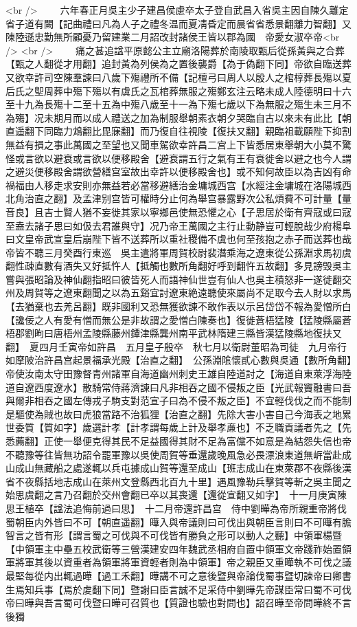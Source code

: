 <br />
　　六年春正月吳主少子建昌侯慮卒太子登自武昌入省吳主因自陳久離定省子道有闕【記曲禮曰凡為人子之禮冬温而夏凊昏定而晨省省悉景翻離力智翻】又陳陸遜忠勤無所顧憂乃留建業二月詔改封諸侯王皆以郡為國　帝愛女淑卒帝<br />
<br />
　　痛之甚追諡平原懿公主立廟洛陽葬於南陵取甄后從孫黃與之合葬【甄之人翻從才用翻】追封黃為列侯為之置後襲爵【為于偽翻下同】帝欲自臨送葬又欲幸許司空陳羣諫曰八歲下殤禮所不備【記檀弓曰周人以殷人之棺椁葬長殤以夏后氏之堲周葬中殤下殤以有虞氏之瓦棺葬無服之殤鄭玄注云略未成人陸德明曰十六至十九為長殤十二至十五為中殤八歲至十一為下殤七歲以下為無服之殤生未三月不為殤】况未期月而以成人禮送之加為制服舉朝素衣朝夕哭臨自古以來未有此比【朝直遥翻下同臨力鴆翻比毘寐翻】而乃復自往視陵【復扶又翻】親臨祖載願陛下抑割無益有損之事此萬國之至望也又聞車駕欲幸許昌二宫上下皆悉居東舉朝大小莫不驚怪或言欲以避衰或言欲以便移殿舍【避衰謂五行之氣有王有衰徙舍以避之也今人謂之避災便移殿舍謂欲營繕宫室故出幸許以便移殿舍也】或不知何故臣以為吉凶有命禍福由人移走求安則亦無益若必當移避繕治金墉城西宫【水經注金墉城在洛陽城西北角治直之翻】及孟津别宫皆可權時分止何為舉宫暴露野次公私煩費不可計量【量音良】且吉士賢人猶不妄徙其家以寧鄉邑使無恐懼之心【子思居於衛有齊寇或曰寇至盍去諸子思曰如伋去君誰與守】况乃帝王萬國之主行止動静豈可輕脫哉少府楊阜曰文皇帝武宣皇后崩陛下皆不送葬所以重社稷備不虞也何至孩抱之赤子而送葬也哉帝皆不聽三月癸酉行東巡　吳主遣將軍周賀校尉裴潛乘海之遼東從公孫淵求馬初虞翻性疎直數有酒失又好抵忤人【抵觸也數所角翻好呼到翻忤五故翻】多見謗毁吳主嘗與張昭論及神仙翻指昭曰彼皆死人而語神仙世豈有仙人也吳主積怒非一遂徙翻交州及周賀等之遼東翻聞之以為五谿宜討遼東絶遠聽使來屬尚不足取今去人財以求馬【去猶棄也去羌呂翻】既非國利又恐無獲欲諫不敢作表以示呂岱岱不報為愛憎所白【讒佞之人有愛有憎而無公是非故謂之愛憎白陳奏也】復徙蒼梧猛陵【猛陵縣屬蒼梧郡劉昫曰唐梧州孟陵縣藤州鐔津縣龔州南平武林隋建三縣皆漢猛陵縣地復扶又翻】　夏四月壬寅帝如許昌　五月皇子殷卒　秋七月以衛尉董昭為司徒　九月帝行如摩陂治許昌宫起景福承光殿【治直之翻】　公孫淵隂懷貳心數與吳通【數所角翻】帝使汝南太守田豫督青州諸軍自海道幽州刺史王雄自陸道討之【海道自東萊浮海陸道自遼西度遼水】散騎常侍蔣濟諫曰凡非相吞之國不侵叛之臣【光武報竇融書曰吾與爾非相吞之國左傳戎子駒支對范宣子曰為不侵不叛之臣】不宜輕伐伐之而不能制是驅使為賊也故曰虎狼當路不治狐狸【治直之翻】先除大害小害自己今海表之地累世委質【質如字】歲選計孝【計孝謂每歲上計及舉孝亷也】不乏職貢議者先之【先悉薦翻】正使一舉便克得其民不足益國得其財不足為富儻不如意是為結怨失信也帝不聽豫等往皆無功詔令罷軍豫以吳使周賀等垂還歲晚風急必畏漂浪東道無㟁當赴成山成山無藏船之處遂輒以兵屯據成山賀等還至成山【班志成山在東萊郡不夜縣後漢省不夜縣括地志成山在萊州文登縣西北百九十里】遇風豫勒兵擊賀等斬之吳主聞之始思虞翻之言乃召翻於交州會翻已卒以其喪還【還從宣翻又如字】　十一月庚寅陳思王植卒【諡法追悔前過曰思】　十二月帝還許昌宫　侍中劉曄為帝所親重帝將伐蜀朝臣内外皆曰不可【朝直遥翻】曄入與帝議則曰可伐出與朝臣言則曰不可曄有膽智言之皆有形【謂言蜀之可伐與不可伐皆有勝負之形可以動人之聽】中領軍楊暨【中領軍主中壘五校武衛等三營漢建安四年魏武丞相府自置中領軍文帝踐祚始置領軍將軍其後以資重者為領軍將軍資輕者則為中領軍】帝之親臣又重曄執不可伐之議最堅每從内出輒過曄【過工禾翻】曄講不可之意後暨與帝論伐蜀事暨切諫帝曰卿書生焉知兵事【焉於䖍翻下同】暨謝曰臣言誠不足采侍中劉曄先帝謀臣常曰蜀不可伐帝曰曄與吾言蜀可伐暨曰曄可召質也【質證也驗也對問也】詔召曄至帝問曄終不言後獨